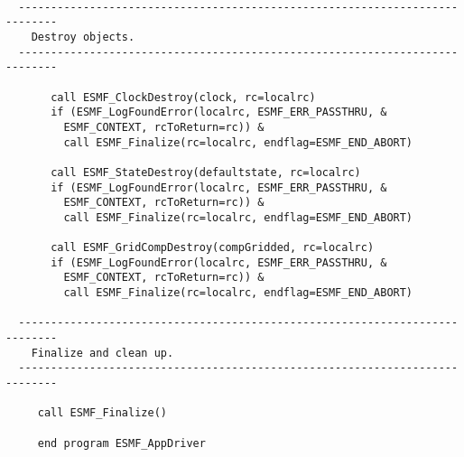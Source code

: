 \begin{verbatim}
 
  ----------------------------------------------------------------------------
    Destroy objects.
  ----------------------------------------------------------------------------
 
       call ESMF_ClockDestroy(clock, rc=localrc)
       if (ESMF_LogFoundError(localrc, ESMF_ERR_PASSTHRU, &
         ESMF_CONTEXT, rcToReturn=rc)) &
         call ESMF_Finalize(rc=localrc, endflag=ESMF_END_ABORT)
 
       call ESMF_StateDestroy(defaultstate, rc=localrc)
       if (ESMF_LogFoundError(localrc, ESMF_ERR_PASSTHRU, &
         ESMF_CONTEXT, rcToReturn=rc)) &
         call ESMF_Finalize(rc=localrc, endflag=ESMF_END_ABORT)
 
       call ESMF_GridCompDestroy(compGridded, rc=localrc)
       if (ESMF_LogFoundError(localrc, ESMF_ERR_PASSTHRU, &
         ESMF_CONTEXT, rcToReturn=rc)) &
         call ESMF_Finalize(rc=localrc, endflag=ESMF_END_ABORT)
 
  ----------------------------------------------------------------------------
    Finalize and clean up.
  ----------------------------------------------------------------------------
 
     call ESMF_Finalize()
 
     end program ESMF_AppDriver
 
  \end{verbatim}
\setlength{\parskip}{\oldparskip}
\setlength{\parindent}{\oldparindent}
\setlength{\baselineskip}{\oldbaselineskip}

